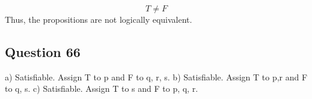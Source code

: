 \documentclass{article}
\begin{document}
\vspace{10pt}
\noindent
\[
T \neq F
\]
Thus, the propositions are not logically equivalent.

\subsection*{Question 66}

a) Satisfiable. Assign T to p and F to q, r, s.\newline
b) Satisfiable. Assign T to p,r and F to q, s.\newline
c) Satisfiable. Assign T to s and F to p, q, r.
\end{document}
